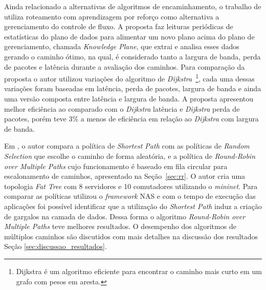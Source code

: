 Ainda relacionado a alternativas de algoritmos de encaminhamento, o trabalho de \cite{casas2020intelligent} utiliza roteamento com aprendizagem por reforço como alternativa a gerenciamento do controle de fluxo. A proposta faz leituras periódicas de estatísticas do plano de dados para alimentar um novo plano acima do plano de gerenciamento, chamada \textit{ Knowledge Plane}, que extrai e analisa esses dados gerando o caminho ótimo, na qual, é considerado tanto a largura de banda, perda de pacotes e latência durante a avaliação dos caminhos. Para comparação da proposta o autor utilizou variações do algoritmo de \textit{Dijkstra}~\footnote{Dijkstra é um algoritmo eficiente para encontrar o caminho mais curto em um grafo com pesos em aresta.}, cada uma dessas variações foram baseadas em latência, perda de pacotes, largura de banda e ainda uma versão composta entre latência e largura de banda. A proposta apresentou melhor eficiência ao comparado com o \textit{Dijkstra} latência e \textit{Dijkstra} perda de pacotes, porém teve 3\% a menos de eficiência em relação ao \textit{Dijkstra} com largura de banda.

Em \cite{marcondes2016executing}, o autor compara a política de \textit{Shortest Path} com as políticas de \textit{Random Selection} que escolhe o caminho de forma aleatória, e a política de \textit{Round-Robin over Multiple Paths} cujo funcionamento é baseado em fila circular para escalonamento de caminhos, apresentado na Seção~\ref{sec:rr}. O autor cria uma topologia \textit{Fat Tree} com 8 servidores e 10 comutadores utilizando o \textit{mininet}. Para comparar as políticas utilizou o \textit{framework} NAS e com o tempo de execução das aplicações foi possível identificar que a utilização do \textit{Shortest Path} induz a criação de gargalos na camada de dados. Dessa forma o algoritmo \textit{Round-Robin over Multiple Paths} teve melhores resultados. O desempenho dos algoritmos de múltiplos caminhos são discutidos com mais detalhes na discussão dos resultados Seção \ref{sec:discussao_resultados}.

